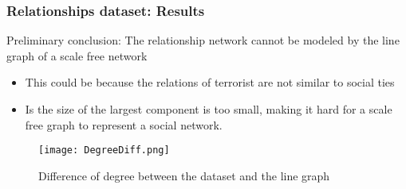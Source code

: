 
\begin{frame}
\frametitle{Relationships dataset: Results}


Preliminary conclusion: The relationship network cannot be modeled by the line graph of a scale free network
\begin{itemize}
\item This could be because the relations of terrorist are not similar to social ties
\item Is the size of the largest component is too small, making it hard for a scale free graph to represent a social network.
\end{itemize}


\begin{figure}[H]
\begin{center}
\texttt{[image: DegreeDiff.png]}
\caption{Difference of degree between the dataset and the line graph}
\label{fig:degdiff}
\end{center}
\end{figure}
\end{frame}

